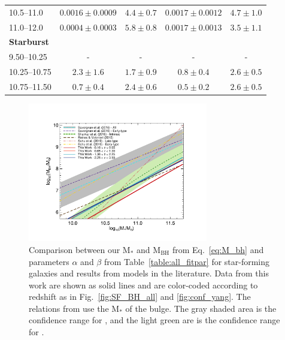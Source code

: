 \begin{table}
\begin{tabular}{l | c c | c c }
10.5--11.0                  & $ 0.0016 \pm 0.0009 $ & $ 4.4 \pm 0.7 $ & $0.0017 \pm 0.0012$ & $ 4.7 \pm 1.0 $ \\
11.0--12.0                  & $ 0.0004 \pm 0.0003 $ & $ 5.8 \pm 0.8 $ & $0.0017 \pm 0.0013$ & $ 3.5 \pm 1.1 $ \\
\hline                      
\textbf{Starburst}          &                       &                 &                     &                 \\
 9.50--10.25                & -                     & -               & -                   & -               \\
10.25--10.75                & $ 2.3   \pm 1.6 $     & $ 1.7 \pm 0.9 $ & $ 0.8  \pm 0.4 $    & $ 2.6 \pm 0.5 $ \\
10.75--11.50                & $ 0.7   \pm 0.4 $     & $ 2.4 \pm 0.6 $ & $ 0.5  \pm 0.2 $    & $ 2.6 \pm 0.5 $ \\
\hline
\end{tabular}
\end{table}
   
   \begin{figure}
   \centering
   \includegraphics[trim={2cm 1.5cm 3cm 2cm}, clip, width=0.7\textwidth]{Figs/reFigureForSection7.pdf}
      \caption{ Comparison between our M$_*$ and M$_\text{BH}$ from Eq.~\ref{eq:M_bh} and parameters $\alpha$ and $\beta$ from Table~\ref{table:all_fitpar} for star-forming galaxies and results from models in the literature. Data from this work are shown as solid lines and are color-coded according to redshift as in Fig.~\ref{fig:SF_BH_all} and \ref{fig:conf_yang}.
      The relations from \citet{2016ApJS..222...10S} use the M$_*$ of the bulge.
      The gray shaded area is the confidence range for \citet{2016ApJS..222...10S}, and the light green are is the confidence range for \citet{2016MNRAS.460.3119S}.
              }
         \label{fig:comp_models}
   \end{figure}

